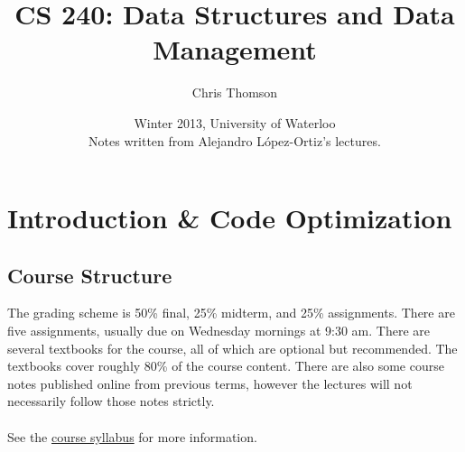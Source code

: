 \documentclass[]{article}
\theoremstyle{definition}
\newcommand{\lecture}[1]{\marginpar{{\footnotesize $\leftarrow$ \underline{#1}}}}
\begin{document}
	\let\ref\Cref

	\title{\bf{CS 240: Data Structures and Data Management}}
	\date{Winter 2013, University of Waterloo \\ \center Notes written from Alejandro L\'opez-Ortiz's lectures.}
	\author{Chris Thomson}
	\maketitle
	\newpage
	\tableofcontents
	\newpage

	\section{Introduction \& Code Optimization} \lecture{January 8, 2013}
		\subsection{Course Structure}
			The grading scheme is 50\% final, 25\% midterm, and 25\% assignments. There are five assignments, usually due on Wednesday mornings at 9:30 am. There are several textbooks for the course, all of which are optional but recommended. The textbooks cover roughly 80\% of the course content. There are also some course notes published online from previous terms, however the lectures will not necessarily follow those notes strictly.
			\\ \\
			See the \href{https://www.student.cs.uwaterloo.ca/~cs240/w13/info.phtml}{course syllabus} for more information.
			
\end{document}
